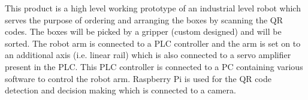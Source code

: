 This product is a high level working prototype of an industrial level robot which serves the purpose of ordering and arranging the boxes by scanning the QR codes. The boxes will be picked by a gripper (custom designed) and will be sorted. The robot arm is connected to a PLC controller and the arm is set on to an additional axis (i.e. linear rail) which is also connected to a servo amplifier present in the PLC. This PLC controller is connected to a PC containing various software to control the robot arm. Raspberry Pi is used for the QR code detection and decision making which is connected to a camera.